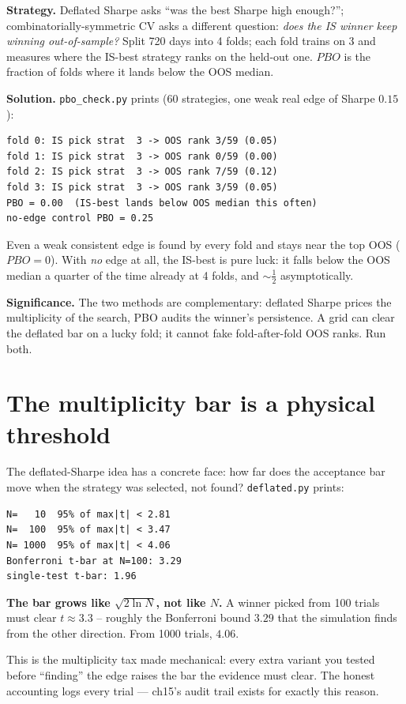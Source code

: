 \begin{example}\label{ex:pbo}
\textbf{Strategy.} Deflated Sharpe asks ``was the best Sharpe high
enough?''; combinatorially-symmetric CV asks a different question:
\emph{does the IS winner keep winning out-of-sample?} Split 720
days into 4 folds; each fold trains on 3 and measures where the
IS-best strategy ranks on the held-out one. $PBO$ is the fraction
of folds where it lands below the OOS median.

\textbf{Solution.} \texttt{pbo\_check.py} prints (60 strategies,
one weak real edge of Sharpe $0.15$):
\begin{verbatim}
fold 0: IS pick strat  3 -> OOS rank 3/59 (0.05)
fold 1: IS pick strat  3 -> OOS rank 0/59 (0.00)
fold 2: IS pick strat  3 -> OOS rank 7/59 (0.12)
fold 3: IS pick strat  3 -> OOS rank 3/59 (0.05)
PBO = 0.00  (IS-best lands below OOS median this often)
no-edge control PBO = 0.25
\end{verbatim}
Even a weak consistent edge is found by every fold and stays
near the top OOS ($PBO=0$). With \emph{no} edge at all, the
IS-best is pure luck: it falls below the OOS median a quarter of
the time already at 4 folds, and $\sim\tfrac12$ asymptotically.

\textbf{Significance.} The two methods are complementary:
deflated Sharpe prices the multiplicity of the search, PBO audits
the winner's persistence. A grid can clear the deflated bar on a
lucky fold; it cannot fake fold-after-fold OOS ranks. Run both.
\end{example}


\section{The multiplicity bar is a physical threshold}\label{sec:multbar}
The deflated-Sharpe idea has a concrete face: how far does the
acceptance bar move when the strategy was selected, not found?
\texttt{deflated.py} prints:
\begin{verbatim}
N=   10  95% of max|t| < 2.81
N=  100  95% of max|t| < 3.47
N= 1000  95% of max|t| < 4.06
Bonferroni t-bar at N=100: 3.29
single-test t-bar: 1.96
\end{verbatim}
\begin{example}\label{ex:multbar}
\textbf{The bar grows like $\sqrt{2\ln N}$, not like $N$.} A
winner picked from 100 trials must clear $t\approx3.3$ --
roughly the Bonferroni bound $3.29$ that the simulation finds
from the other direction. From 1000 trials, $4.06$.
\begin{solution}
This is the multiplicity tax made mechanical: every extra
variant you tested before ``finding'' the edge raises the bar
the evidence must clear. The honest accounting logs every trial
--- ch15's audit trail exists for exactly this reason.
\end{solution}
\end{example}
